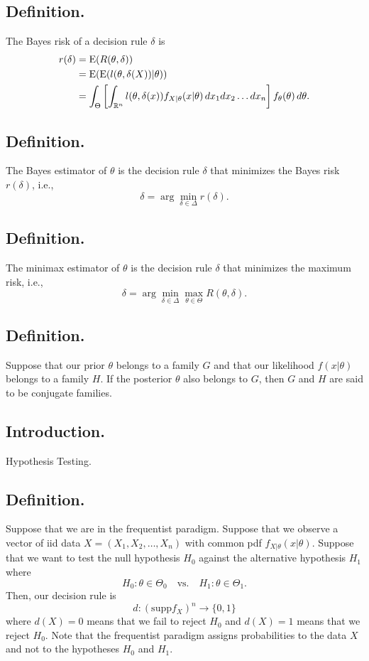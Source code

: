 \documentclass[titlepage]{article}
\begin{document}
\subsection{Definition.} The Bayes risk of a decision rule $\delta$ is 
\begin{align*}
    r(\delta) &= \text{E}(R(\theta, \delta)) \\
              &= \text{E}(\text{E}(l(\theta, \delta(X))|\theta)) \\
              &= \int_{\Theta}\left[\int_{\mathbb{R}^{n}}l(\theta, \delta(x))f_{X|\theta}(x|\theta)\, dx_{1}dx_{2}\ldots dx_{n}\right]f_{\theta}(\theta)\, d\theta.
\end{align*}

\subsection{Definition.} The Bayes estimator of $\theta$ is the decision rule $\delta$ that minimizes the Bayes risk $r(\delta)$, i.e., 
$$\delta = \arg\min_{\delta\in\Delta}r(\delta).$$

\subsection{Definition.} The minimax estimator of $\theta$ is the decision rule $\delta$ that minimizes the maximum risk, i.e., 
$$\delta = \arg\min_{\delta\in\Delta}\max_{\theta\in\Theta}R(\theta, \delta).$$

\subsection{Definition.} Suppose that our prior $\theta$ belongs to a family $G$ and that our likelihood $f(x|\theta)$ belongs to a family $H$. If the posterior $\theta$ also belongs to $G$, then $G$ and $H$ are said to be conjugate families.

\newpage {}

\subsection{Introduction.} Hypothesis Testing.

\subsection{Definition.} Suppose that we are in the frequentist paradigm. Suppose that we observe a vector of iid data $X = (X_{1}, X_{2}, \ldots, X_{n})$ with common pdf $f_{X|\theta}(x|\theta)$. Suppose that we want to test the null hypothesis $H_{0}$ against the alternative hypothesis $H_{1}$ where 
$$H_{0}: \theta \in \Theta_{0} \quad \text{vs.} \quad H_{1}: \theta \in \Theta_{1}.$$
Then, our decision rule is 
$$d: (\text{supp} f_{X})^{n} \to \{0, 1\}$$
where $d(X) = 0$ means that we fail to reject $H_{0}$ and $d(X) = 1$ means that we reject $H_{0}$. Note that the frequentist paradigm assigns probabilities to the data $X$ and not to the hypotheses $H_{0}$ and $H_{1}$.
\end{document}
